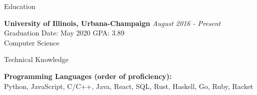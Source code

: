\documentclass{resume} %
\begin{document}

    \begin{rSection}{Education}

{\bf University of Illinois, Urbana-Champaign} \hfill {\em August 2016 - Present} 
\\ Graduation Date: May 2020 \hfill { GPA: 3.89}
\\ Computer Science


        \end{rSection}

        \begin{rSection}{Technical Knowledge}

            \textbf{Programming Languages (order of proficiency):}\\  Python, JavaScript, C/C++, Java, React, SQL, Rust, Haskell, Go, Ruby, Racket

            \end{rSection}

\end{document}
